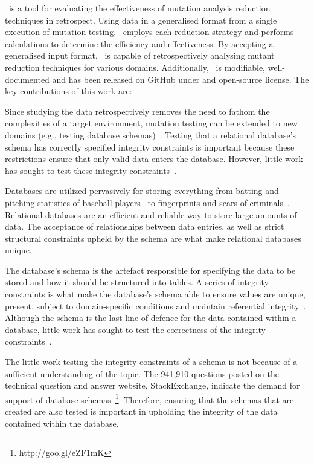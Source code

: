 \mr~is a tool for evaluating the effectiveness of mutation analysis reduction techniques in retrospect. Using data in a
generalised format from a single execution of mutation testing, \mr~employs each reduction strategy and performs
calculations to determine the efficiency and effectiveness. By accepting a generalised input format, \mr~is capable of
retrospectively analysing mutant reduction techniques for various domains.  Additionally, \mr~is modifiable,
well-documented and has been released on GitHub under and open-source license. The key contributions of this work are:


Since studying the data retrospectively removes the need to fathom the complexities of a target environment, mutation
testing can be extended to new domains (e.g., testing database schemas)~\cite{mcminn2016virtual,
mcminn2015effectiveness, wright2013efficient}.  Testing that a relational database's schema has correctly specified
integrity constraints is important because these restrictions ensure that only valid data enters the database. However,
little work has sought to test these integrity constraints~\cite{mcminn2016virtual}.

Databases are utilized pervasively for storing everything from batting and pitching statistics of baseball
players~\cite{lahmanbaseball} to fingerprints and scars of criminals~\cite{ngi}.  Relational databases are an efficient
and reliable way to store large amounts of data.  The acceptance of relationships between data entries, as well as
strict structural constraints upheld by the schema are what make relational databases unique.

The database's schema is the artefact responsible for specifying the data to be stored and how it should be structured
into tables. A series of integrity constraints is what make the database's schema able to ensure values are unique,
present, subject to domain-specific conditions and maintain referential integrity~\cite{mcminn2016virtual}.  Although
the schema is the last line of defence for the data contained within a database, little work has sought to test the
correctness of the integrity constraints~\cite{mcminn2015effectiveness}.




The little work testing the integrity constraints of a schema is not because of a sufficient understanding of the topic.
The 941,910 questions posted on the technical question and answer website, StackExchange, indicate the demand for
support of database schemas~\footnote{http://goo.gl/eZF1mK}. Therefore, ensuring that the schemas that are created are
also tested is important in upholding the integrity of the data contained within the database.

